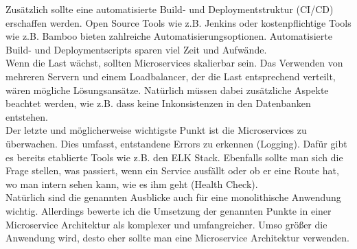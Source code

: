 Zusätzlich sollte eine automatisierte Build- und Deploymentstruktur (CI/CD) erschaffen werden. Open Source Tools wie z.B. Jenkins oder kostenpflichtige Tools wie z.B. Bamboo bieten zahlreiche Automatisierungsoptionen. Automatisierte Build- und Deploymentscripts sparen viel Zeit und Aufwände. \\

Wenn die Last wächst, sollten Microservices skalierbar sein. Das Verwenden von mehreren Servern und einem Loadbalancer, der die Last entsprechend verteilt, wären mögliche Lösungsansätze. Natürlich müssen dabei zusätzliche Aspekte beachtet werden, wie z.B. dass keine Inkonsistenzen in den Datenbanken entstehen. \\

Der letzte und möglicherweise wichtigste Punkt ist die Microservices zu überwachen. Dies umfasst, entstandene Errors zu erkennen (Logging). Dafür gibt es bereits etablierte Tools wie z.B. den ELK Stack. Ebenfalls sollte man sich die Frage stellen, was passiert, wenn ein Service ausfällt oder ob er eine Route hat, wo man intern sehen kann, wie es ihm geht (Health Check). \\
 
Natürlich sind die genannten Ausblicke auch für eine monolithische Anwendung wichtig. Allerdings bewerte ich die Umsetzung der genannten Punkte in einer Microservice Architektur als komplexer und umfangreicher. Umso größer die Anwendung wird, desto eher sollte man eine Microservice Architektur verwenden.